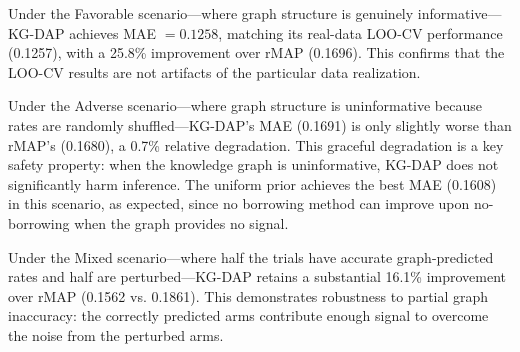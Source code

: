 \documentclass[12pt]{article}
\begin{document}
Under the Favorable scenario---where graph structure is genuinely informative---KG-DAP achieves MAE $= 0.1258$, matching its real-data LOO-CV performance (0.1257), with a 25.8\% improvement over rMAP (0.1696). This confirms that the LOO-CV results are not artifacts of the particular data realization.

Under the Adverse scenario---where graph structure is uninformative because rates are randomly shuffled---KG-DAP's MAE (0.1691) is only slightly worse than rMAP's (0.1680), a 0.7\% relative degradation. This graceful degradation is a key safety property: when the knowledge graph is uninformative, KG-DAP does not significantly harm inference. The uniform prior achieves the best MAE (0.1608) in this scenario, as expected, since no borrowing method can improve upon no-borrowing when the graph provides no signal.

Under the Mixed scenario---where half the trials have accurate graph-predicted rates and half are perturbed---KG-DAP retains a substantial 16.1\% improvement over rMAP (0.1562 vs. 0.1861). This demonstrates robustness to partial graph inaccuracy: the correctly predicted arms contribute enough signal to overcome the noise from the perturbed arms.
\end{document}
